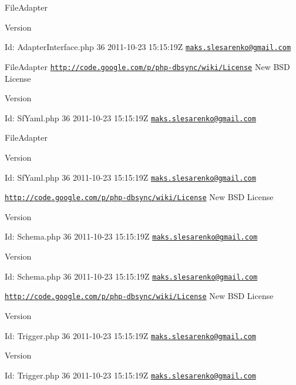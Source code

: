 FileAdapter \begin{DoxyVersion}{Version}

\end{DoxyVersion}
\begin{DoxyParagraph}{Id:}
AdapterInterface.php 36 2011-\/10-\/23 15:15:19Z \href{mailto:maks.slesarenko@gmail.com}{\tt maks.slesarenko@gmail.com} 
\end{DoxyParagraph}


FileAdapter  \href{http://code.google.com/p/php-dbsync/wiki/License}{\tt http://code.google.com/p/php-\/dbsync/wiki/License} New BSD License \begin{DoxyVersion}{Version}

\end{DoxyVersion}
\begin{DoxyParagraph}{Id:}
SfYaml.php 36 2011-\/10-\/23 15:15:19Z \href{mailto:maks.slesarenko@gmail.com}{\tt maks.slesarenko@gmail.com} 
\end{DoxyParagraph}


FileAdapter \begin{DoxyVersion}{Version}

\end{DoxyVersion}
\begin{DoxyParagraph}{Id:}
SfYaml.php 36 2011-\/10-\/23 15:15:19Z \href{mailto:maks.slesarenko@gmail.com}{\tt maks.slesarenko@gmail.com} 
\end{DoxyParagraph}


\href{http://code.google.com/p/php-dbsync/wiki/License}{\tt http://code.google.com/p/php-\/dbsync/wiki/License} New BSD License \begin{DoxyVersion}{Version}

\end{DoxyVersion}
\begin{DoxyParagraph}{Id:}
Schema.php 36 2011-\/10-\/23 15:15:19Z \href{mailto:maks.slesarenko@gmail.com}{\tt maks.slesarenko@gmail.com} 
\end{DoxyParagraph}


\begin{DoxyVersion}{Version}

\end{DoxyVersion}
\begin{DoxyParagraph}{Id:}
Schema.php 36 2011-\/10-\/23 15:15:19Z \href{mailto:maks.slesarenko@gmail.com}{\tt maks.slesarenko@gmail.com} 
\end{DoxyParagraph}


\href{http://code.google.com/p/php-dbsync/wiki/License}{\tt http://code.google.com/p/php-\/dbsync/wiki/License} New BSD License \begin{DoxyVersion}{Version}

\end{DoxyVersion}
\begin{DoxyParagraph}{Id:}
Trigger.php 36 2011-\/10-\/23 15:15:19Z \href{mailto:maks.slesarenko@gmail.com}{\tt maks.slesarenko@gmail.com} 
\end{DoxyParagraph}


\begin{DoxyVersion}{Version}

\end{DoxyVersion}
\begin{DoxyParagraph}{Id:}
Trigger.php 36 2011-\/10-\/23 15:15:19Z \href{mailto:maks.slesarenko@gmail.com}{\tt maks.slesarenko@gmail.com} 
\end{DoxyParagraph}
